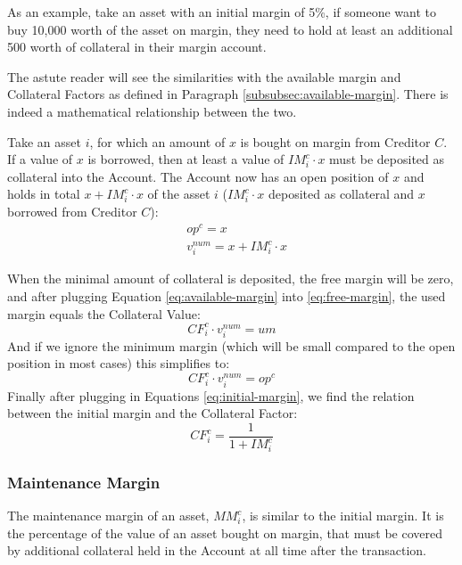 \documentclass[sigconf,nonacm]{acmart}
\begin{document}
As an example, take an asset with an initial margin of 5\%, if someone want to buy 10,000 worth of the asset on margin,
they need to hold at least an additional 500 worth of collateral in their margin account.

The astute reader will see the similarities with the available margin and Collateral Factors as defined in Paragraph \ref{subsubsec:available-margin}.
There is indeed a mathematical relationship between the two.

Take an asset $i$, for which an amount of $x$ is bought on margin from Creditor $C$.
If a value of $x$ is borrowed, then at least a value of $IM_{i}^{c} \cdot x$ must be deposited as collateral into the Account.
The Account now has an open position of $x$ and holds in total $x + IM_{i}^{c} \cdot x$ of the asset $i$ ($IM_{i}^{c} \cdot x$ deposited as collateral and $x$ borrowed from Creditor $C$):
\begin{equation}
    \label{eq:initial-margin}
    \begin{split}
        &op^c = x\\
        &v^{num}_i = x + IM_{i}^{c} \cdot x
    \end{split}
\end{equation}

When the minimal amount of collateral is deposited, the free margin will be zero, and after plugging Equation \ref{eq:available-margin} into \ref{eq:free-margin}, the used margin equals the Collateral Value:
\begin{equation}
    CF_{i}^{c} \cdot v^{num}_i = um
\end{equation}
And if we ignore the minimum margin (which will be small compared to the open position in most cases) this simplifies to:
\begin{equation}
    CF_{i}^{c} \cdot v^{num}_i = op^c
\end{equation}
Finally after plugging in Equations \ref{eq:initial-margin}, we find the relation between the initial margin and the Collateral Factor:
\begin{equation}
    CF_{i}^{c} = \frac{1}{1 + IM_{i}^{c}}
\end{equation}

\subsubsection{Maintenance Margin}
The maintenance margin of an asset, $MM_{i}^{c}$, is similar to the initial margin.
It is the percentage of the value of an asset bought on margin, that must be covered by additional collateral held in the Account at all time after the transaction.
\end{document}
